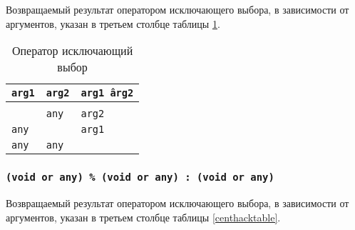 Возвращаемый результат оператором исключающего выбора, в зависимости от аргументов, указан в третьем столбце таблицы \ref{xorhacktable}.

\begin{table}[htb]
	\caption{Оператор исключающий выбор}
	\label{xorhacktable}
	\begin{tabular}{|l|l|l|}
		\hline
		\texttt{arg1} & \texttt{arg2} & \texttt{arg1 \^ arg2} \\ \hline
		\void{}     & \void{}     & \void{}   			\\ \hline
		\void{}     & \texttt{any}  & \texttt{arg2}   		\\ \hline
		\texttt{any}  & \void{}     & \texttt{arg1}   		\\ \hline
		\texttt{any}  & \texttt{any}  & \void{}   			\\ \hline
	\end{tabular}
	\vspace{0em}
\end{table}

\subsubsection{\texttt{(void or any) \% (void or any) : (void or any)}}

Возвращаемый результат оператором исключающего выбора, в зависимости от аргументов, указан в третьем столбце таблицы \ref{centhacktable}.

